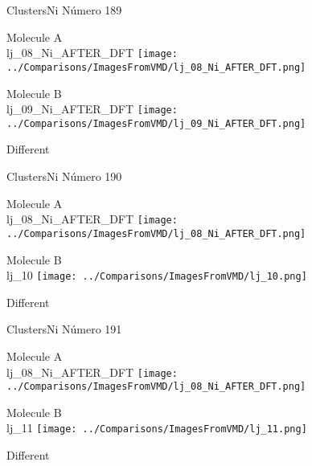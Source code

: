  \newpage

\vtab[-3cm]
\begin{center}
{\large ClustersNi \tab Número 189}
\end{center}
\begin{multicols}{2}
\begin{center}
Molecule A \\ 
lj\_08\_Ni\_AFTER\_DFT
\texttt{[image: ../Comparisons/ImagesFromVMD/lj\_08\_Ni\_AFTER\_DFT.png]}
\\
\vtab

\columnbreak
Molecule B \\ 
lj\_09\_Ni\_AFTER\_DFT
\texttt{[image: ../Comparisons/ImagesFromVMD/lj\_09\_Ni\_AFTER\_DFT.png]}
\\
\vtab


\end{center}
\end{multicols}
\begin{center}
\textcolor{NavyBlue}{\Large Different}
\end{center}

 \newpage

\vtab[-3cm]
\begin{center}
{\large ClustersNi \tab Número 190}
\end{center}
\begin{multicols}{2}
\begin{center}
Molecule A \\ 
lj\_08\_Ni\_AFTER\_DFT
\texttt{[image: ../Comparisons/ImagesFromVMD/lj\_08\_Ni\_AFTER\_DFT.png]}
\\
\vtab

\columnbreak
Molecule B \\ 
lj\_10
\texttt{[image: ../Comparisons/ImagesFromVMD/lj\_10.png]}
\\
\vtab


\end{center}
\end{multicols}
\begin{center}
\textcolor{NavyBlue}{\Large Different}
\end{center}

 \newpage

\vtab[-3cm]
\begin{center}
{\large ClustersNi \tab Número 191}
\end{center}
\begin{multicols}{2}
\begin{center}
Molecule A \\ 
lj\_08\_Ni\_AFTER\_DFT
\texttt{[image: ../Comparisons/ImagesFromVMD/lj\_08\_Ni\_AFTER\_DFT.png]}
\\
\vtab

\columnbreak
Molecule B \\ 
lj\_11
\texttt{[image: ../Comparisons/ImagesFromVMD/lj\_11.png]}
\\
\vtab


\end{center}
\end{multicols}
\begin{center}
\textcolor{NavyBlue}{\Large Different}
\end{center}

